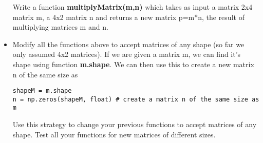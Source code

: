 \documentclass[11pt,a4paper]{report}
\begin{document}
\begin{itemize}
 Write a function \textbf{multiplyMatrix(m,n)} which takes as input a matrix 2x4 matrix m, a 4x2 matrix n and returns a new matrix p=m*n, the result of multiplying matrices m and n. 
 
 \item Modify all the functions above to accept matrices of any shape (so far we only assumed 4x2 matrices). If we are given a matrix m, we can find it's shape using function \textbf{m.shape}. We can then use this to create a new matrix n of the same size as 
 
 \begin{lstlisting}
shapeM = m.shape 
n = np.zeros(shapeM, float) # create a matrix n of the same size as m
\end{lstlisting}
 Use this strategy to change your previous functions to accept matrices of any shape. Test all your functions for new matrices of different sizes. 
 
 
\end{itemize}
\end{document}
